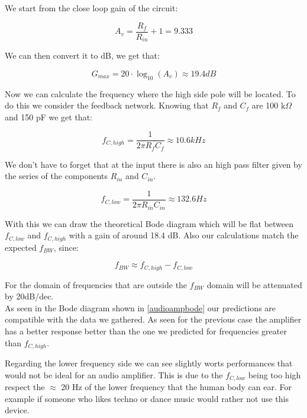 \documentclass[../main.tex]{subfiles}
\begin{document}
We start from the close loop gain of the circuit:

\begin{equation}
	A_v = \frac{R_f}{R_{in}} + 1 = 9.333
\end{equation}

We can then convert it to dB, we get that:

\begin{equation}
	G_{max} = 20 \cdot \log_{10} \left ( A_v \right ) \approx 19.4 \unit{dB}
\end{equation}

Now we can calculate the frequency where the high side pole will be located.
To do this we consider the feedback network.
Knowing that $R_f$ and $C_f$ are 100 k$\Omega$ and 150 pF we get that:

\begin{equation}
	f_{C,high} = \frac{1}{2\pi R_f C_f} \approx 10.6 \unit{kHz}
\end{equation}

We don't have to forget that at the input there is also an high pass filter given by the series of the components $R_{in}$ and $C_{in}$.

\begin{equation}
	f_{C,low} = \frac{1}{2\pi R_{in} C_{in}} \approx 132.6 \unit{Hz}
\end{equation}

With this we can draw the theoretical Bode diagram which will be flat between $f_{C,low}$ and $f_{C,high}$ with a gain of around 18.4 dB. Also our calculations match the expected $f_{BW}$, since:

\begin{equation}
	f_{BW} \approx f_{C,high} - f_{C,low}
\end{equation} 

For the domain of frequencies that are outside the $f_{BW}$ domain will be attenuated by 20dB/dec.\\

As seen in the Bode diagram shown in \autoref{audioampbode} our predictions are compatible with the data we gathered. As seen for the previous case the amplifier has a better response better than the one we predicted for frequencies greater than $f_{C,high}$.

Regarding the lower frequency side we can see slightly worts performances that would not be ideal for an audio amplifier. This is due to the $f_{C,low}$ being too high respect the $\approx$ 20 Hz of the lower frequency that the human body can ear. For example if someone who likes techno or dance music would rather not use this device.\\
\end{document}
